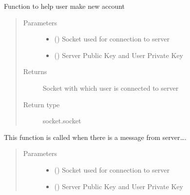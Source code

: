 \documentclass[letterpaper,10pt,english]{sphinxmanual}
\begin{document}
\begin{fulllineitems}
\label{\detokenize{app:app.signup}}
Function to help user make new account
\begin{quote}\begin{description}
\item[{Parameters}] \leavevmode\begin{itemize}
\item {} 
 () \textendash{} Socket used for connection to server

\item {} 
 () \textendash{} Server Public Key and User Private Key

\end{itemize}

\item[{Returns}] \leavevmode
Socket with which user is connected to server

\item[{Return type}] \leavevmode
socket.socket

\end{description}\end{quote}

\end{fulllineitems}


\begin{fulllineitems}
\label{\detokenize{app:app.handleMessageFromServer}}
This function is called when there is a message from server….
\begin{quote}\begin{description}
\item[{Parameters}] \leavevmode\begin{itemize}
\item {} 
 () \textendash{} Socket used for connection to server

\item {} 
 () \textendash{} Server Public Key and User Private Key

\end{itemize}

\end{description}\end{quote}

\end{fulllineitems}
\end{document}
